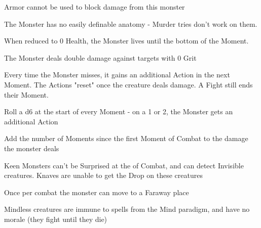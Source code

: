 { \newpage




Armor cannot be used to block damage from this monster


The Monster has no easily definable anatomy - Murder tries don't work on them.


When reduced to 0 Health, the Monster lives until the bottom of the  Moment.


The Monster deals double damage against targets with 0 Grit


Every time the Monster misses, it gains an additional Action in the next Moment.  The Actions "reset" once the creature deals damage. A Fight \RO still ends their Moment.


Roll a d6 at the start of every Moment - on a 1 or 2, the Monster gets an additional Action


Add the number of Moments since the first Moment of Combat to the damage the monster deals


Keen Monsters can't be Surprised at the   of Combat, and can detect Invisible creatures. Knaves are unable to get the Drop on these creatures


Once per combat the monster can move to a Faraway place


Mindless creatures are immune to spells from the Mind paradigm, and have no morale (they fight until they die)


}
